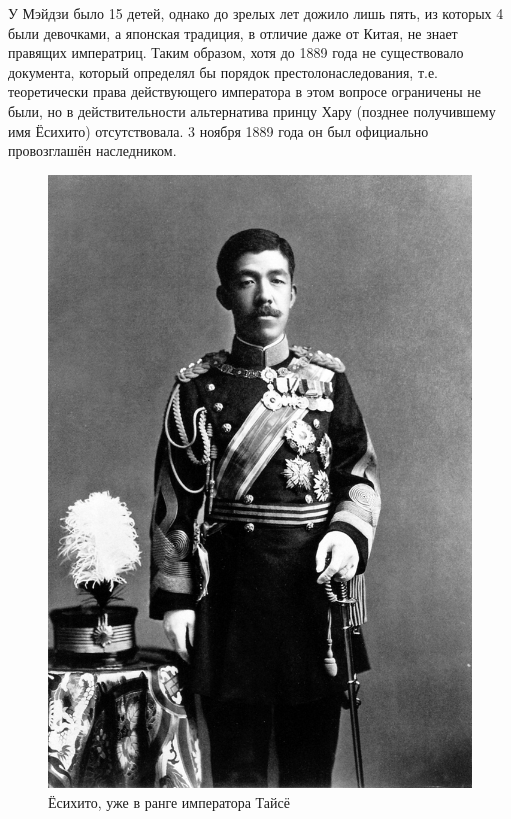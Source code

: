 У Мэйдзи было 15 детей, однако до зрелых лет дожило лишь пять, из которых 4 были девочками, а японская традиция, в отличие даже от Китая, не знает правящих императриц. Таким образом, хотя до 1889 года не существовало документа, который определял бы порядок престолонаследования, т.е. теоретически права действующего императора в этом вопросе ограничены не были, но в действительности альтернатива принцу Хару (позднее получившему имя Ёсихито) отсутствовала. 3 ноября 1889 года он был официально провозглашён наследником. 
\begin{figure}[h!tb] 
	\centering\includegraphics[scale=0.5]{Glava2/UPgOys64H08.jpg}
	\caption{Ёсихито, уже в ранге императора Тайсё}%
\end{figure}

